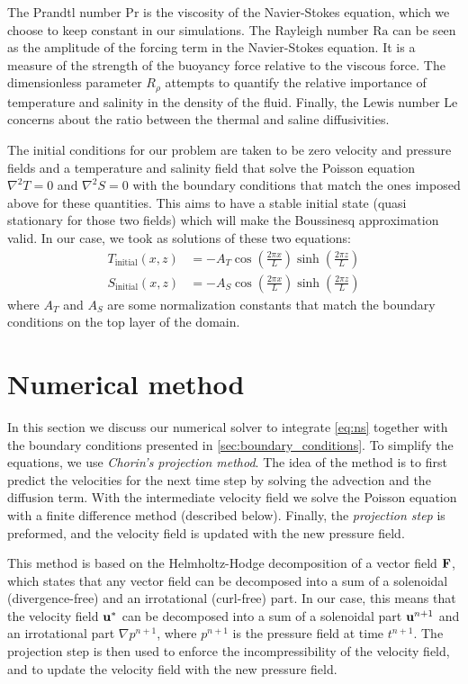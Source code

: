 \documentclass{article}
\def\Ra{\mathrm{Ra}}
\def\Pr{\mathrm{Pr}}
\def\Le{\mathrm{Le}}
\begin{document}
The Prandtl number $\Pr$ is the viscosity of the Navier-Stokes equation, which we choose to keep constant in our simulations. The Rayleigh number $\Ra$ can be seen as the amplitude of the forcing term in the Navier-Stokes equation. It is a measure of the strength of the buoyancy force relative to the viscous force. The dimensionless parameter $R_\rho$ attempts to quantify the relative importance of temperature and salinity in the density of the fluid. Finally, the Lewis number $\Le$ concerns about the ratio between the thermal and saline diffusivities.

The initial conditions for our problem are taken to be zero velocity and pressure fields and a temperature and salinity field that solve the Poisson equation $\nabla^2T = 0$ and $\nabla^2S = 0$ with the boundary conditions that match the ones imposed above for these quantities. This aims to have a stable initial state (quasi stationary for those two fields) which will make the Boussinesq approximation valid. In our case, we took as solutions of these two equations:
\begin{equation}
  \begin{aligned}
    T_\mathrm{initial}(x,z) & = -A_T \cos\left(\frac{2\pi x}{L}\right) \sinh\left(\frac{2\pi z}{L}\right) \\
    S_\mathrm{initial}(x,z) & = -A_S \cos\left(\frac{2\pi x}{L}\right) \sinh\left(\frac{2\pi z}{L}\right)
  \end{aligned}
\end{equation}
where $A_T$ and $A_S$ are some normalization constants that match the boundary conditions on the top layer of the domain.

\section{Numerical method}

In this section we discuss our numerical solver to integrate \cref{eq:ns} together with the boundary conditions presented in \cref{sec:boundary_conditions}. To simplify the equations, we use \textit{Chorin's projection method}. The idea of the method is to first predict the velocities for the next time step by solving the advection and the diffusion term. With the intermediate velocity field we solve the Poisson equation with a finite difference method (described below). Finally, the \textit{projection step} is preformed, and the velocity field is updated with the new pressure field.

This method is based on the Helmholtz-Hodge decomposition of a vector field $\boldsymbol{\mathrm{F}}$, which states that any vector field can be decomposed into a sum of a solenoidal (divergence-free) and an irrotational (curl-free) part. In our case, this means that the velocity field $\boldsymbol{\mathrm{u}}^*$ can be decomposed into a sum of a solenoidal part $\boldsymbol{\mathrm{u}}^{n+1}$ and an irrotational part $\nabla p^{n+1}$, where $p^{n+1}$ is the pressure field at time $t^{n+1}$. The projection step is then used to enforce the incompressibility of the velocity field, and to update the velocity field with the new pressure field.
\end{document}
